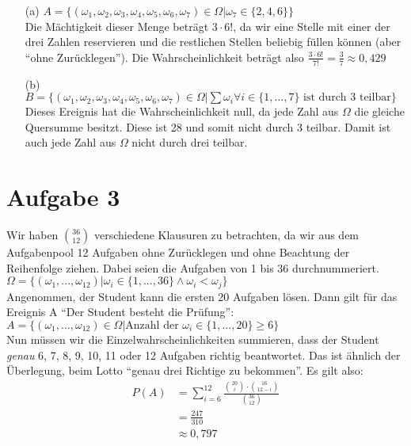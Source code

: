 \documentclass[10pt,a4paper]{article}
\begin{document}
\begin{itemize}
\item[(a)] $A = \{(\omega_{1},\omega_{2},\omega_{3},\omega_{4},\omega_{5},\omega_{6},\omega_{7}) \in \Omega | \omega_{7} \in \{2,4,6\}  \}$\\
Die Mächtigkeit dieser Menge beträgt $3 \cdot 6!$, da wir eine Stelle mit einer der drei Zahlen reservieren und die restlichen Stellen beliebig füllen können (aber ``ohne Zurücklegen''). Die Wahrscheinlichkeit beträgt also $\frac{3 \cdot 6!}{7!} = \frac{3}{7} \approx 0,429$
\item[(b)] $B = \{(\omega_{1},\omega_{2},\omega_{3},\omega_{4},\omega_{5},\omega_{6},\omega_{7}) \in \Omega |\sum \omega_{i} \forall i \in\{1,...,7\} \text{ ist durch 3 teilbar} \}$\\
Dieses Ereignis hat die Wahrscheinlichkeit null, da jede Zahl aus $\Omega$ die gleiche Quersumme besitzt. Diese ist 28 und somit nicht durch 3 teilbar. Damit ist auch jede Zahl aus $\Omega$ nicht durch drei teilbar.
\end{itemize}

\section*{Aufgabe 3}
Wir haben $\binom{36}{12}$ verschiedene Klausuren zu betrachten, da wir aus dem Aufgabenpool 12 Aufgaben ohne Zurücklegen und ohne Beachtung der Reihenfolge ziehen. Dabei seien die Aufgaben von 1 bis 36 durchnummeriert.\\
$\Omega = \{(\omega_{1},...,\omega_{12}) | \omega_{i} \in \{1,...,36\} \wedge \omega_{i} < \omega_{j} \}$ \\
Angenommen, der Student kann die ersten 20 Aufgaben lösen. Dann gilt für das Ereignis A ``Der Student besteht die Prüfung'':\\
$A = \{(\omega_{1},...,\omega_{12}) \in \Omega | \text{Anzahl der }\omega_{i} \in \{1,...,20\} \geq 6 \}$ \\
Nun müssen wir die Einzelwahrscheinlichkeiten summieren, dass der Student \textit{genau} 6, 7, 8, 9, 10, 11 oder 12 Aufgaben richtig beantwortet. Das ist ähnlich der Überlegung, beim Lotto ``genau drei Richtige zu bekommen''. Es gilt also:\\
\begin{align*}
	P(A) &= \sum_{i=6}^{12} \frac{\binom{20}{i} \cdot \binom{16}{12 - i}}{\binom{36}{12}}\\
	&= \frac{247}{310}\\
	&\approx 0,797
\end{align*}
\end{document}
